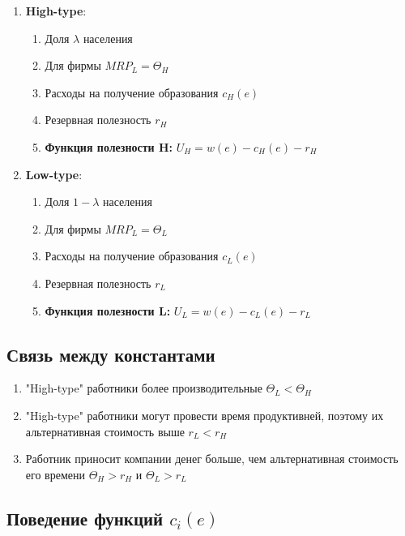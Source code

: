 \begin{enumerate}
    \item \textbf{High-type}: \begin{enumerate}
            \item Доля $\lambda$ населения
            \item Для фирмы $MRP_L=\Theta_H$
            \item Расходы на получение образования $c_H(e)$
            \item Резервная полезность $r_H$
            \item \textbf{Функция полезности H:} $U_H=w(e)-c_H(e)-r_H$
        \end{enumerate}
        \item \textbf{Low-type}: \begin{enumerate}
            \item Доля $1-\lambda$ населения
            \item Для фирмы $MRP_L=\Theta_L$
            \item Расходы на получение образования $c_L(e)$
            \item Резервная полезность $r_L$
            \item \textbf{Функция полезности L:} $U_L=w(e)-c_L(e)-r_L$
        \end{enumerate}
\end{enumerate}

\subsection{Связь между константами}

\begin{enumerate}
    \item "High-type" работники более производительные $\Theta_L<\Theta_H$
    \item "High-type" работники могут провести время продуктивней, поэтому их альтернативная стоимость выше $r_L<r_H$
    \item Работник приносит компании денег больше, чем альтернативная стоимость его времени $\Theta_H>r_H$ и $\Theta_L>r_L$
\end{enumerate}

\subsection{Поведение функций $c_i(e)$}

